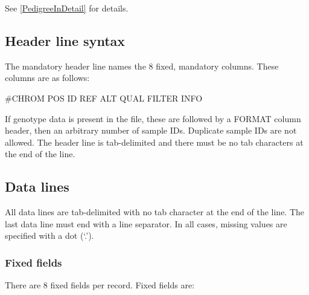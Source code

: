 \documentclass[8pt]{article}
\begin{document}
\noindent See \ref{PedigreeInDetail} for details.


\subsection{Header line syntax}
\label{header-line}
The mandatory header line names the 8 fixed, mandatory columns. These columns are as follows:
\begin{center}
       \#CHROM
\qquad POS
\qquad ID
\qquad REF
\qquad ALT
\qquad QUAL
\qquad FILTER
\qquad INFO
\end{center}
\noindent
If genotype data is present in the file, these are followed by a FORMAT column header, then an arbitrary number of sample IDs.
Duplicate sample IDs are not allowed.
The header line is tab-delimited and there must be no tab characters at the end of the line.

\subsection{Data lines}
\label{data-lines}
All data lines are tab-delimited with no tab character at the end of the line.
The last data line must end with a line separator.
In all cases, missing values are specified with a dot (`.').

\subsubsection{Fixed fields}
\label{fixed-fields}
There are 8 fixed fields per record.
Fixed fields are:
\end{document}
